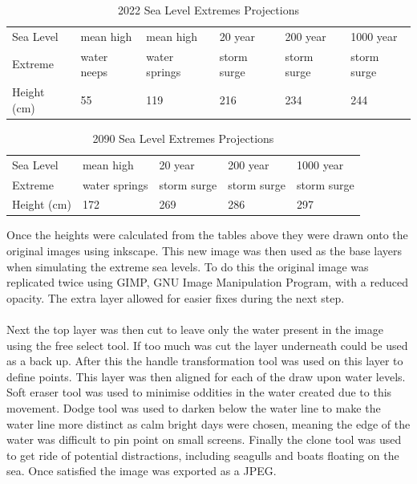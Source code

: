 \begin{table}[h]
    \centering
    \begin{tabular}{|l|l|l|l|l|l|}
    \hline
     Sea Level &   mean high  & mean high  & 20 year  & 200 year   & 1000 year  \\ \newline
     Extreme &  water neeps & water springs &  storm surge  & storm surge  &  storm surge  \\ \hline
       Height (cm) &  55 & 119 & 216 & 234 & 244 \\ \hline
    \end{tabular}
    \caption{2022 Sea Level Extremes Projections \cite{kartverket_se_2020}}
    \label{2022_sle_projections}
\end{table}

\begin{table}[h]
    \centering
    \begin{tabular}{|l|l|l|l|l|}
    \hline
       Sea Level &  mean high & 20 year   & 200 year &  1000 year   \\ \newline
       Extreme & water springs &  storm surge  &  storm surge  &  storm surge  \\ \hline
       Height (cm) & 172 & 269 & 286 & 297 \\ \hline
    \end{tabular}
    \caption{2090 Sea Level Extremes Projections \cite{kartverket_se_2020}}
    \label{2090_sle_projections}
\end{table}

Once the heights were calculated from the tables above they were drawn onto the original images using inkscape. This new image was then used as the base layers when simulating the extreme sea levels. To do this the original image was replicated twice using GIMP, GNU Image Manipulation Program, with a reduced opacity. The extra layer allowed for easier fixes during the next step. 
\paragraph{}
Next the top layer was then cut to leave only the water present in the image using the free select tool. If too much was cut the layer underneath could be used as a back up. After this the handle transformation tool was used on this layer to define points. This layer was then aligned for each of the draw upon water levels. Soft eraser tool was used to minimise oddities in the water created due to this movement. Dodge tool was used to darken below the water line to make the water line more distinct as calm bright days were chosen, meaning the edge of the water was difficult to pin point on small screens. Finally the clone tool was used to get ride of potential distractions, including seagulls and boats floating on the sea. Once satisfied the image was exported as a JPEG. 

